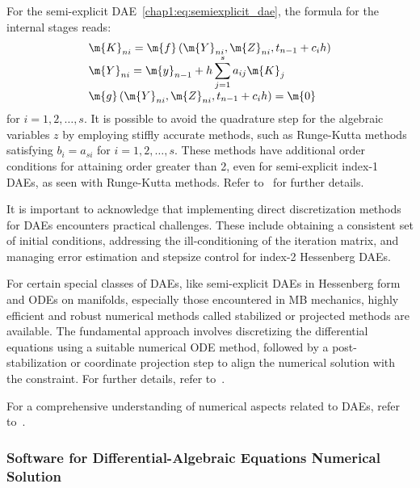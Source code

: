 For the semi-explicit \ac{DAE}~\eqref{chap1:eq:semiexplicit_dae}, the formula for the internal stages reads:
%
\begin{equation*}
  \begin{array}{l}
  \m{K}_{ni} = \m{f}\left(\m{Y}_{ni}, \m{Z}_{ni}, t_{n-1}+c_i h\right) \\
  \m{Y}_{ni} = \m{y}_{n-1} + h\displaystyle\sum_{j=1}^s a_{ij}\m{K}_j \\
  \m{g}\left(\m{Y}_{ni}, \m{Z}_{ni}, t_{n-1}+c_i h\right) = \m{0}
  \end{array}
\end{equation*}
%
for $i = 1, 2, \dots, s$. It is possible to avoid the quadrature step for the algebraic variables $z$ by employing stiffly accurate methods, such as Runge-Kutta methods satisfying $b_i = a_{si}$ for $i = 1, 2, \dots, s$. These methods have additional order conditions for attaining order greater than 2, even for semi-explicit index-1 \acp{DAE}, as seen with Runge-Kutta methods. Refer to~\cite{brenan1995numerical} for further details.

It is important to acknowledge that implementing direct discretization methods for \acp{DAE} encounters practical challenges. These include obtaining a consistent set of initial conditions, addressing the ill-conditioning of the iteration matrix, and managing error estimation and stepsize control for index-2 Hessenberg \acp{DAE}.

For certain special classes of \acp{DAE}, like semi-explicit \acp{DAE} in Hessenberg form and \acp{ODE} on manifolds, especially those encountered in \ac{MB} mechanics, highly efficient and robust numerical methods called stabilized or projected methods are available. The fundamental approach involves discretizing the differential equations using a suitable numerical \ac{ODE} method, followed by a post-stabilization or coordinate projection step to align the numerical solution with the constraint. For further details, refer to~\cite{eichsoellner1998numerical}.

For a comprehensive understanding of numerical aspects related to \acp{DAE}, refer to~\cite{ascher1998computer, brenan1995numerical, hairer1999stiff}.

\subsubsection{Software for Differential-Algebraic Equations Numerical Solution}

